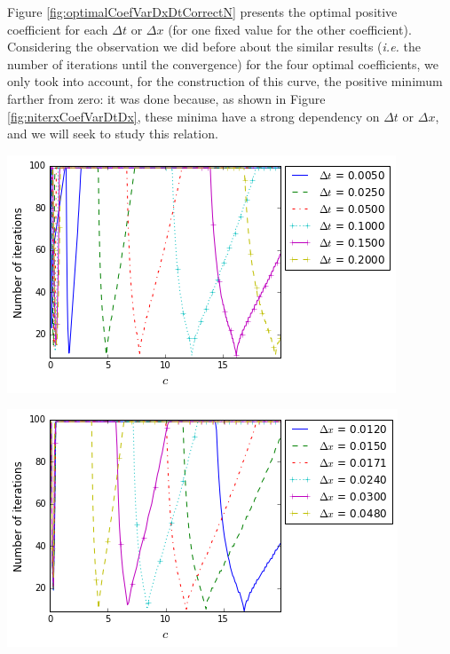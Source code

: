 \indent Figure \ref{fig:optimalCoefVarDxDtCorrectN} presents the optimal positive coefficient for each $\Delta t$ or $\Delta x$ (for one fixed value for the other coefficient). Considering the observation we did before about the similar results (\emph{i.e.} the number of iterations until the convergence) for the four optimal coefficients, we only took into account, for the construction of this curve, the positive minimum farther from zero: it was done because, as shown in Figure \ref{fig:niterxCoefVarDtDx}, these minima have a strong dependency on $\Delta t$ or $\Delta x$, and we will seek to study this relation.

\begingroup
\begin{minipage}{.5\linewidth}
\begin{center}
	\includegraphics[scale=.375]{Fig5a.png}
\end{center}
\end{minipage}
\begin{minipage}{.5\linewidth}
\begin{center}
	\includegraphics[scale=.375]{Fig5b.png}
\end{center}
\end{minipage}
\endgroup


